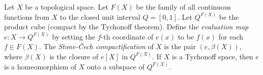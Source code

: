 Let $X$ be a topological space. Let $F(X)$ be the family of all continuous functions from $X$ to the closed unit interval $Q = [0, 1]$. Let $Q^{F(X)}$ be the product cube (compact by the Tychonoff theorem). Define the \emph{evaluation map} $e: X \to Q^{F(X)}$ by setting the $f$-th coordinate of $e(x)$ to be $f(x)$ for each $f \in F(X)$. The \emph{Stone-Čech compactification} of $X$ is the pair $(e, \beta(X))$, where $\beta(X)$ is the closure of $e[X]$ in $Q^{F(X)}$. If $X$ is a Tychonoff space, then $e$ is a homeomorphism of $X$ onto a subspace of $Q^{F(X)}$.
